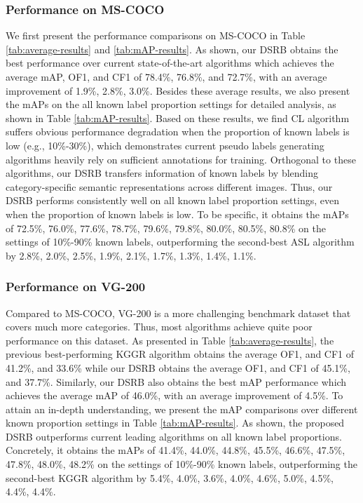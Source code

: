 \documentclass[lettersize,journal]{IEEEtran}
\begin{document}
\subsubsection{Performance on MS-COCO} 
We first present the performance comparisons on MS-COCO in Table \ref{tab:average-results} and \ref{tab:mAP-results}. As shown, our DSRB obtains the best performance over current state-of-the-art algorithms which achieves the average mAP, OF1, and CF1 of 78.4\%, 76.8\%, and 72.7\%, with an average improvement of 1.9\%, 2.8\%, 3.0\%. Besides these average results, we also present the mAPs on the all known label proportion settings for detailed analysis, as shown in Table \ref{tab:mAP-results}. Based on these results, we find CL algorithm suffers obvious performance degradation when the proportion of known labels is low (e.g., 10\%-30\%), which demonstrates current pseudo labels generating algorithms heavily rely on sufficient annotations for training. Orthogonal to these algorithms, our DSRB transfers information of known labels by blending category-specific semantic representations across different images. Thus, our DSRB performs consistently well on all known label proportion settings, even when the proportion of known labels is low. To be specific, it obtains the mAPs of 72.5\%, 76.0\%, 77.6\%, 78.7\%, 79.6\%, 79.8\%, 80.0\%, 80.5\%, 80.8\% on the settings of 10\%-90\% known labels, outperforming the second-best ASL algorithm by 2.8\%, 2.0\%, 2.5\%, 1.9\%, 2.1\%, 1.7\%, 1.3\%, 1.4\%, 1.1\%.

\subsubsection{Performance on VG-200}
Compared to MS-COCO, VG-200 is a more challenging benchmark dataset that covers much more categories. Thus, most algorithms achieve quite poor performance on this dataset. As presented in Table \ref{tab:average-results}, the previous best-performing KGGR algorithm obtains the average OF1, and CF1 of 41.2\%, and 33.6\% while our DSRB obtains the average OF1, and CF1 of 45.1\%, and 37.7\%. Similarly, our DSRB also obtains the best mAP performance which achieves the average mAP of 46.0\%, with an average improvement of 4.5\%. To attain an in-depth understanding, we present the mAP comparisons over different known proportion settings in Table \ref{tab:mAP-results}. As shown, the proposed DSRB outperforms current leading algorithms on all known label proportions. Concretely, it obtains the mAPs of 41.4\%, 44.0\%, 44.8\%, 45.5\%, 46.6\%, 47.5\%, 47.8\%, 48.0\%, 48.2\% on the settings of 10\%-90\% known labels, outperforming the second-best KGGR algorithm by 5.4\%, 4.0\%, 3.6\%, 4.0\%, 4.6\%, 5.0\%, 4.5\%, 4.4\%, 4.4\%.
\end{document}
